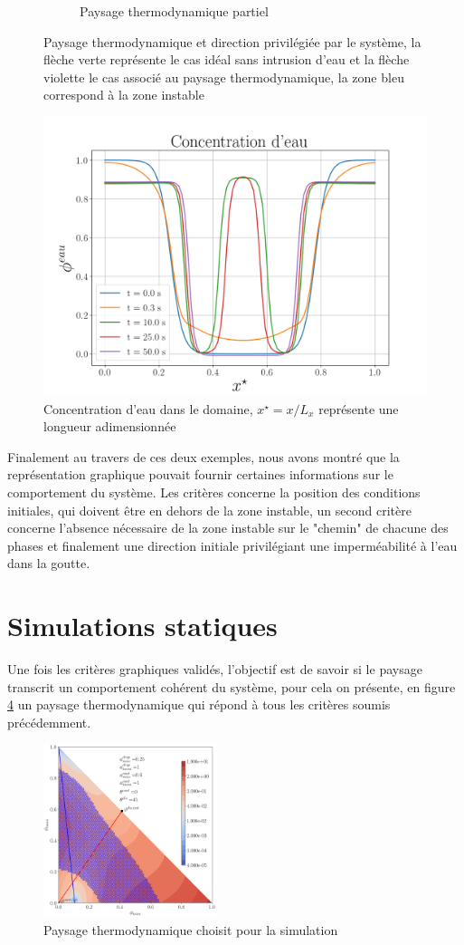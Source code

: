 \begin{figure}[H]
\begin{subfigure}[H]{0.45\textwidth}
 		\caption{Paysage thermodynamique partiel}
 		\label{fig:gradpasbon}
 	\end{subfigure}
 	\caption{Paysage thermodynamique et direction privilégiée par le système, la flèche verte représente le cas idéal sans intrusion d'eau et la flèche violette le cas associé au paysage thermodynamique, la zone bleu correspond à la zone instable}
 	\label{fig:paysage2}
 \end{figure}\vspace{-0.9cm}
 \begin{figure}[H]
 	\centering
 	\includegraphics[width=0.5\linewidth]{figure/eau_ref}
 	\caption[Concentration d'eau dans le domaine]{Concentration d'eau dans le domaine, $x^{\star} = x / L_x$ représente une longueur adimensionnée}
 	\label{fig:eauref}
 \end{figure}\vspace{-0.7cm}
Finalement au travers de ces deux exemples, nous avons montré que la représentation graphique pouvait fournir certaines informations sur le comportement du système. Les critères concerne la position des conditions initiales, qui doivent être en dehors de la zone instable, un second critère concerne l'absence nécessaire de la zone instable sur le "chemin" de chacune des phases et finalement une direction initiale privilégiant une imperméabilité à l'eau dans la goutte.
\section{Simulations statiques}
Une fois les critères graphiques validés, l'objectif est de savoir si le paysage transcrit un comportement cohérent du système, pour cela on présente, en figure \ref{fig:thechoosenone} un paysage thermodynamique qui répond à tous les critères soumis précédemment.
\begin{figure}[H]
		\centering
		\includegraphics[width=0.45\textwidth]{figure/Paysage_ecriture1.png}
	\caption{Paysage thermodynamique choisit pour la simulation}
	\label{fig:thechoosenone}
\end{figure}

